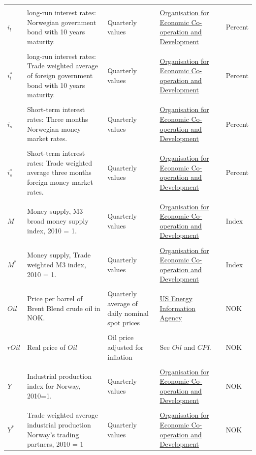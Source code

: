 \documentclass[10pt]{article}
\numberwithin{equation}{section}
\numberwithin{table}{section}
\numberwithin{figure}{section}
\begin{document}
\begin{spacing}{1.5}
\begin{tabularx}{\textwidth}{lLLLp{1cm}}
    &\\
    $i_l$ & long-run interest rates: Norwegian government bond with 10 years maturity. & Quarterly values &  \href{http://stats.oecd.org/}{Organisation for Economic Co-operation and Development} & Percent\\
    & \\
    $i_l^*$ & long-run interest rates: Trade weighted average of foreign government bond with 10 years maturity. & Quarterly values &  \href{http://stats.oecd.org/}{Organisation for Economic Co-operation and Development} & Percent\\
    & \\
    $i_s$ & Short-term interest rates: Three months Norwegian money market rates. & Quarterly values &  \href{http://stats.oecd.org/}{Organisation for Economic Co-operation and Development} & Percent\\
    & \\
    $i_s^*$ & Short-term interest rates: Trade weighted average three months foreign money market rates. & Quarterly values &  \href{http://stats.oecd.org/}{Organisation for Economic Co-operation and Development} & Percent\\
    &\\
    $M$ & Money supply, M3 broad money supply index, 2010 = 1. & Quarterly values & \href{http://stats.oecd.org/}{Organisation for Economic Co-operation and Development} & Index\\
    &\\
    $M^*$ & Money supply, Trade weighted M3 index, 2010 = 1. & Quarterly values  & \href{http://stats.oecd.org/}{Organisation for Economic Co-operation and Development} & Index\\
    &\\
    $Oil$ & Price per barrel of Brent Blend crude oil in NOK. & Quarterly average of daily nominal spot prices & \href{https://www.eia.gov/dnav/pet/hist/LeafHandler.ashx?n=PET\&s=RBRTE\&f=D}{US Energy Information Agency} & NOK\\
    &\\
    $rOil$ & Real price of $Oil$ & Oil price adjusted for inflation & See $Oil$ and $CPI$. & NOK\\
    &\\
    $Y$ & Industrial production index for Norway, 2010=1. & Quarterly values & \href{http://stats.oecd.org/}{Organisation for Economic Co-operation and Development} & NOK\\
    &\\
    $Y^*$ & Trade weighted average industrial production Norway's trading partners, 2010 = 1 & Quarterly values  &  \href{http://stats.oecd.org/}{Organisation for Economic Co-operation and Development}  & NOK\\

\end{tabularx}
\end{spacing}
\end{document}
